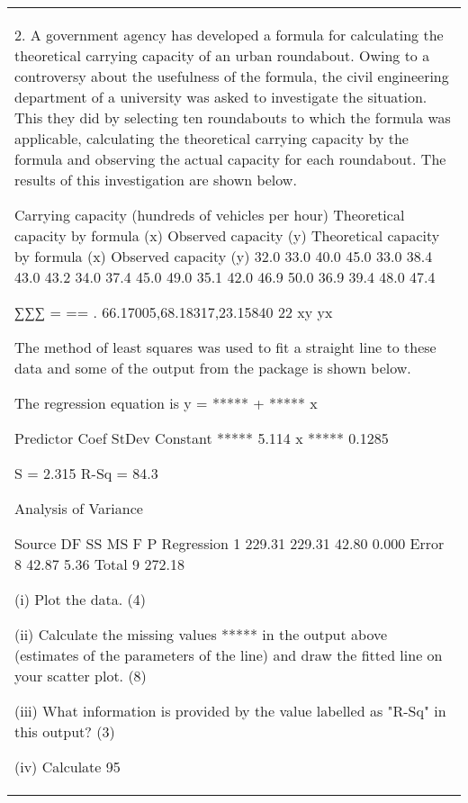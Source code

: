 \documentclass[a4paper,12pt]{article}
\begin{document}
\begin{table}[ht!]
 \centering
 \begin{tabular}{|p{15cm}|}
 \hline  
2. A government agency has developed a formula for calculating the theoretical carrying capacity of an urban roundabout.  Owing to a controversy about the usefulness of the formula, the civil engineering department of a university was asked to investigate the situation.  This they did by selecting ten roundabouts to which the formula was applicable, calculating the theoretical carrying capacity by the formula and observing the actual capacity for each roundabout.  The results of this investigation are shown below. 
 
Carrying capacity (hundreds of vehicles per hour) Theoretical capacity by formula (x) Observed capacity (y) Theoretical capacity by formula (x) Observed capacity  (y) 32.0 33.0 40.0 45.0 33.0 38.4 43.0 43.2 34.0 37.4 45.0 49.0 35.1 42.0 46.9 50.0 36.9 39.4 48.0 47.4 
 
∑∑∑ = == . 66.17005,68.18317,23.15840 22 xy yx 
 
The method of least squares was used to fit a straight line to these data and some of the output from the package is shown below. 
 
The regression equation is y =  ***** + ***** x  
 
Predictor Coef    StDev           Constant  *****     5.114        x   *****   0.1285        
 
S = 2.315       R-Sq = 84.3%
 
Analysis of Variance 
 
Source  DF      SS         MS             F          P Regression    1 229.31      229.31     42.80    0.000 Error     8   42.87          5.36 Total     9 272.18 
 
(i) Plot the data.               (4) 
 
(ii) Calculate the missing values ***** in the output above (estimates of the parameters of the line) and draw the fitted line on your scatter plot.        (8) 
 
(iii) What information is provided by the value labelled as "R-Sq" in this output?                (3) 
 
(iv) Calculate 95%
  \end{tabular}
\end{table}
\end{document}
